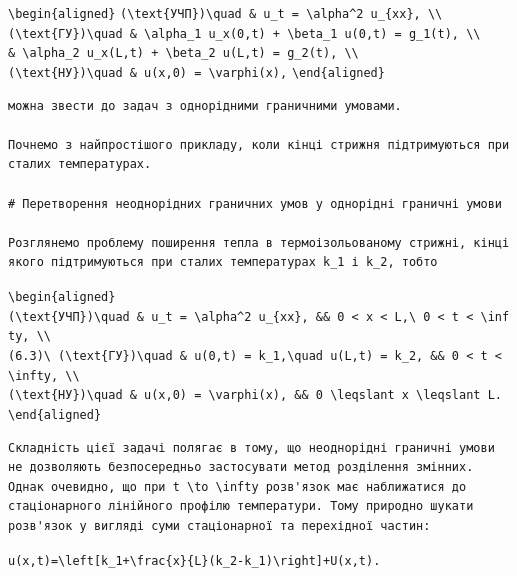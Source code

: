 \documentclass[
  ukrainian,
]{article}
\begin{document}
\texttt{\textbackslash{}begin\{aligned\}}
\texttt{(\textbackslash{}text\{УЧП\})\textbackslash{}quad\ \&\ u\_t\ =\ \textbackslash{}alpha\^{}2\ u\_\{xx\},\ \textbackslash{}\textbackslash{}}
\texttt{(\textbackslash{}text\{ГУ\})\textbackslash{}quad\ \&\ \textbackslash{}alpha\_1\ u\_x(0,t)\ +\ \textbackslash{}beta\_1\ u(0,t)\ =\ g\_1(t),\ \textbackslash{}\textbackslash{}}
\texttt{\&\ \textbackslash{}alpha\_2\ u\_x(L,t)\ +\ \textbackslash{}beta\_2\ u(L,t)\ =\ g\_2(t),\ \textbackslash{}\textbackslash{}}
\texttt{(\textbackslash{}text\{НУ\})\textbackslash{}quad\ \&\ u(x,0)\ =\ \textbackslash{}varphi(x),}
\texttt{\textbackslash{}end\{aligned\}}

\begin{verbatim}
можна звести до задач з однорідними граничними умовами.

Почнемо з найпростішого прикладу, коли кінці стрижня підтримуються при сталих температурах.

# Перетворення неоднорідних граничних умов у однорідні граничні умови

Розглянемо проблему поширення тепла в термоізольованому стрижні, кінці якого підтримуються при сталих температурах k_1 і k_2, тобто
\end{verbatim}

\texttt{\textbackslash{}begin\{aligned\}}
\texttt{(\textbackslash{}text\{УЧП\})\textbackslash{}quad\ \&\ u\_t\ =\ \textbackslash{}alpha\^{}2\ u\_\{xx\},\ \&\&\ 0\ \textless{}\ x\ \textless{}\ L,\textbackslash{}\ 0\ \textless{}\ t\ \textless{}\ \textbackslash{}infty,\ \textbackslash{}\textbackslash{}}
\texttt{(6.3)\textbackslash{}\ (\textbackslash{}text\{ГУ\})\textbackslash{}quad\ \&\ u(0,t)\ =\ k\_1,\textbackslash{}quad\ u(L,t)\ =\ k\_2,\ \&\&\ 0\ \textless{}\ t\ \textless{}\ \textbackslash{}infty,\ \textbackslash{}\textbackslash{}}
\texttt{(\textbackslash{}text\{НУ\})\textbackslash{}quad\ \&\ u(x,0)\ =\ \textbackslash{}varphi(x),\ \&\&\ 0\ \textbackslash{}leqslant\ x\ \textbackslash{}leqslant\ L.}
\texttt{\textbackslash{}end\{aligned\}}

\begin{verbatim}
Складність цієї задачі полягає в тому, що неоднорідні граничні умови не дозволяють безпосередньо застосувати метод розділення змінних. Однак очевидно, що при t \to \infty розв'язок має наближатися до стаціонарного лінійного профілю температури. Тому природно шукати розв'язок у вигляді суми стаціонарної та перехідної частин:
\end{verbatim}

\texttt{u(x,t)=\textbackslash{}left{[}k\_1+\textbackslash{}frac\{x\}\{L\}(k\_2-k\_1)\textbackslash{}right{]}+U(x,t).}
\end{document}
